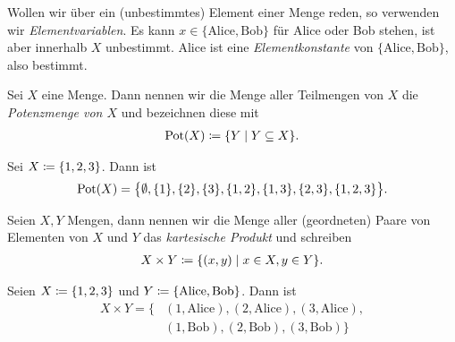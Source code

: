 \begin{bspn}
\begin{enumerate}
    \end{enumerate}      

    
    Wollen wir über ein (unbestimmtes) Element einer Menge reden, so
    verwenden wir \emph{Elementvariablen}. Es kann $x \in \{ \text{Alice},
    \text{Bob} \}$ für Alice oder Bob stehen, ist aber innerhalb $X$
    unbestimmt. Alice ist eine \emph{Elementkonstante} von $\{
    \text{Alice}, \text{Bob} \}$, also bestimmt.

\end{bspn}


\begin{definn}

  Sei $X$ eine Menge. Dann nennen wir die Menge aller Teilmengen von $X$
  die \emph{Potenzmenge von $X$} und bezeichnen diese mit
  \begin{align*}
    \operatorname{Pot}(X) \coloneqq \{ Y \mid Y\subseteq X\}.
  \end{align*}

\end{definn}


\begin{bspn}

  Sei $X \coloneqq \{ 1, 2, 3 \}$. Dann ist
  \begin{align*}
    \operatorname{Pot}(X) = \big\{ \emptyset, \{  1 \}, \{ 2 \}, \{ 3 \}, 
     \{ 1,2 \}, \{ 1,3 \}, \{ 2,3 \}, 
     \{ 1,2,3 \} \big\}.
  \end{align*}

\end{bspn}


\begin{definn}

  Seien $X,Y$ Mengen, dann nennen wir die Menge aller (geordneten) Paare
  von Elementen von $X$ und $Y$ das \emph{kartesische Produkt} und
  schreiben
  \begin{align*}
    X \times Y \coloneqq \{ (x,y) \mid x\in X, y\in Y \}.
  \end{align*}
  
\end{definn}


\begin{bspn}

  Seien $X \coloneqq \{ 1, 2, 3 \}$ und $Y \coloneqq \{ \text{Alice}, \text{Bob}
  \}$. Dann ist
  \begin{align*}
    X \times Y = \big\{ &(1, \text{Alice}), (2, \text{Alice}), (3,\text{Alice}), \\
    &(1, \text{Bob}), (2, \text{Bob}), (3, \text{Bob}) \big\}
  \end{align*}
  
\end{bspn}



